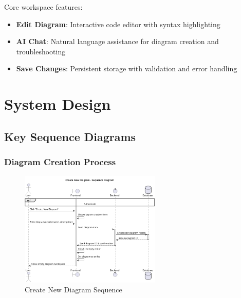 Core workspace features:
\begin{itemize}
    \item \textbf{Edit Diagram}: Interactive code editor with syntax highlighting
    \item \textbf{AI Chat}: Natural language assistance for diagram creation and troubleshooting
    \item \textbf{Save Changes}: Persistent storage with validation and error handling
\end{itemize}

\section{System Design}


\subsection{Key Sequence Diagrams}

\subsubsection{Diagram Creation Process}
\begin{figure}[H]
\centering
\includegraphics[width=0.6\textwidth]{conception/SprintIV/sequence_diagrams/sequence_diagramManagement_4_1_CreateNewDiagram.png}
\caption{Create New Diagram Sequence}
\end{figure}

